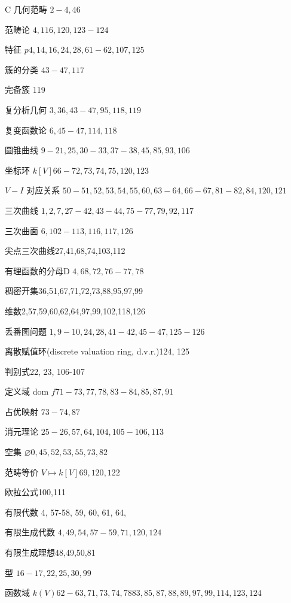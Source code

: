 C 几何范畴 \(2 - 4,{46}\)

范畴论 \(4,{116},{120},{123} - {124}\)

特征 \({p4},{14},{16},{24},{28},{61} - {62},{107},{125}\)

簇的分类 \({43} - {47},{117}\)

完备簇 119

复分析几何 \(3,{36},{43} - {47},{95},{118},{119}\)

复变函数论 \(6,{45} - {47},{114},{118}\)

圆锥曲线 \(9 - {21},{25},{30} - {33},{37} - {38},{45},{85},{93},{106}\)

坐标环 \(k\left\lbrack  V\right\rbrack  {66} - {72},{73},{74},{75},{120},{123}\)

\(V - I\) 对应关系 \({50} - {51},{52},{53},{54},{55},{60},{63} - {64},{66} - {67},{81} - {82},{84},{120},{121}\)

三次曲线 \(1,2,7,{27} - {42},{43} - {44},{75} - {77},{79},{92},{117}\)

三次曲面 \(6,{102} - {113},{116},{117},{126}\)

尖点三次曲线27,41,68,74,103,112

有理函数的分母D \(4,{68},{72},{76} - {77},{78}\)

稠密开集36,51,67,71,72,73,88,95,97,99

维数2,57,59,60,62,64,97,99,102,118,126

丢番图问题 \(1,9 - {10},{24},{28},{41} - {42},{45} - {47},{125} - {126}\)

离散赋值环(discrete valuation ring, d.v.r.)124, 125

判别式22, 23, 106-107

定义域 dom \({f71} - {73},{77},{78},{83} - {84},{85},{87},{91}\)

占优映射 \({73} - {74},{87}\)

消元理论 \({25} - {26},{57},{64},{104},{105} - {106},{113}\)

空集 \(\varnothing 0,{45},{52},{53},{55},{73},{82}\)

范畴等价 \(V \mapsto  k\left\lbrack  V\right\rbrack  {69},{120},{122}\)

欧拉公式100,111

有限代数 4, 57-58, 59, 60, 61, 64,

有限生成代数 \(4,{49},{54},{57} - {59},{71},{120},{124}\)

有限生成理想48,49,50,81

型 \({16} - {17},{22},{25},{30},{99}\)

函数域 \(k\left( V\right) {62} - {63},{71},{73},{74},{7883},{85},{87},{88},{89},{97},{99},{114},{123},{124}\)

